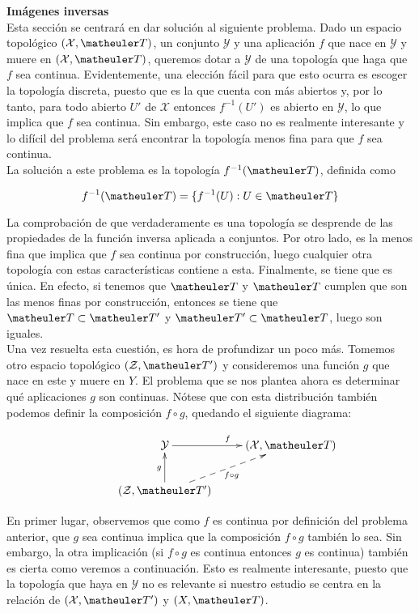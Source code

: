 \textbf{Imágenes inversas} \\

Esta sección se centrará en dar solución al siguiente problema. Dado un espacio topológico $(\mathcal{X},\T)$, un conjunto $\mathcal{Y}$ y una aplicación $f$ que nace en $\mathcal{Y}$ y muere en $(\mathcal{X},\T)$, queremos dotar a $\mathcal{Y}$ de una topología que haga que $f$ sea continua. Evidentemente, una elección fácil para que esto ocurra es escoger la topología discreta, puesto que es la que cuenta con más abiertos y, por lo tanto, para todo abierto $U'$ de $\mathcal{X}$ entonces $f^{-1}(U')$ es abierto en $\mathcal{Y}$, lo que implica que $f$ sea continua. Sin embargo, este caso no es realmente interesante y lo difícil del problema será encontrar la topología menos fina para que $f$ sea continua. \\

La solución a este problema es la topología $f^{-1}(\T)$, definida como 

\[f^{-1}(\T)=\{f^{-1}(U):U\in \T\}\]

La comprobación de que verdaderamente es una topología se desprende de las propiedades de la función inversa aplicada a conjuntos. Por otro lado, es la menos fina que implica que $f$ sea continua por construcción, luego cualquier otra topología con estas características contiene a esta. Finalmente, se tiene que es única. En efecto, si tenemos que $\T$ y $\T$ cumplen que son las menos finas por construcción, entonces se tiene que $\T\subset \T'$ y $\T'\subset \T$, luego son iguales. \\

Una vez resuelta esta cuestión, es hora de profundizar un poco más. Tomemos otro espacio topológico $(\mathcal{Z},\T')$ y consideremos una función $g$ que nace en este y muere en $Y$. El problema que se nos plantea ahora es determinar qué aplicaciones $g$ son continuas. Nótese que con esta distribución también podemos definir la composición $f\circ g$, quedando el siguiente diagrama:

\begin{equation*}
\xymatrix{
&\mathcal{Y} \ar[r]^f
&(\mathcal{X},\T) \\
&(\mathcal{Z},\T') \ar@{-->}[ru]_{f\circ g} \ar[u]^g}
\end{equation*}

En primer lugar, observemos que como $f$ es continua por definición del problema anterior, que $g$ sea continua implica que la composición $f\circ g$ también lo sea. Sin embargo, la otra implicación (si $f\circ g$ es continua entonces $g$ es continua) también es cierta como veremos a continuación. Esto es realmente interesante, puesto que la topología que haya en $\mathcal{Y}$ no es relevante si nuestro estudio se centra en la relación de $(\mathcal{X},\T')$ y $(X,\T)$. \\

